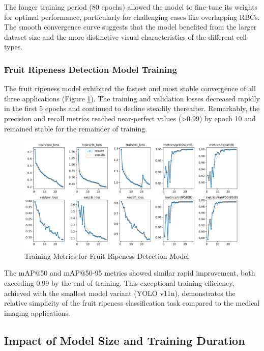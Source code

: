 \begin{multicols}{2}
The longer training period (80 epochs) allowed the model to fine-tune its weights for optimal performance, particularly for challenging cases like overlapping RBCs. The smooth convergence curve suggests that the model benefited from the larger dataset size and the more distinctive visual characteristics of the different cell types.

\subsubsection{Fruit Ripeness Detection Model Training}

The fruit ripeness model exhibited the fastest and most stable convergence of all three applications (Figure \ref{fig:fruit_training}). The training and validation losses decreased rapidly in the first 5 epochs and continued to decline steadily thereafter. Remarkably, the precision and recall metrics reached near-perfect values (>0.99) by epoch 10 and remained stable for the remainder of training.

\begin{figure}[h]
\centering
\includegraphics[width=0.9\columnwidth]{../datas/agriculture/results.png}
\caption{Training Metrics for Fruit Ripeness Detection Model}
\label{fig:fruit_training}
\end{figure}

The mAP@50 and mAP@50-95 metrics showed similar rapid improvement, both exceeding 0.99 by the end of training. This exceptional training efficiency, achieved with the smallest model variant (YOLO v11n), demonstrates the relative simplicity of the fruit ripeness classification task compared to the medical imaging applications.

\subsection{Impact of Model Size and Training Duration}


\end{multicols}
